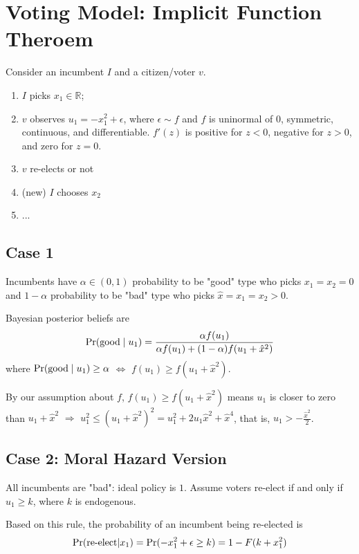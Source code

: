 \documentclass[11pt]{elegantbook}
\begin{document}
\section{Voting Model: Implicit Function Theroem}
Consider an incumbent $I$ and a citizen/voter $v$.
\begin{enumerate}[$\bullet$]
    \item $I$ picks $x_1\in \mathbb{R}$;
    \item $v$ observes $u_1=-x_1^2+\epsilon$, where $\epsilon\sim f$ and $f$ is uninormal of $0$, symmetric, continuous, and differentiable. $f'(z)$ is positive for $z<0$, negative for $z>0$, and zero for $z=0$.
    \item $v$ re-elects or not
    \item (new) $I$ chooses $x_2$
    \item ...
\end{enumerate}

\subsection{Case 1}
Incumbents have $\alpha\in (0,1)$ probability to be "good" type who picks $x_1=x_2=0$ and $1-\alpha$ probability to be "bad" type who picks $\hat{x}=x_1=x_2>0$.

Bayesian posterior beliefs are
\begin{equation}
    \begin{aligned}
        \textnormal{Pr}(\textnormal{good}\mid u_1)=\frac{\alpha f(u_1)}{\alpha f(u_1)+(1-\alpha)f(u_1+\hat{x}^2)}
    \end{aligned}
    \nonumber
\end{equation}
where $\textnormal{Pr}(\textnormal{good}\mid u_1)\geq \alpha$ $\Leftrightarrow$ $f(u_1)\geq f(u_1+\hat{x}^2)$.

By our assumption about $f$, $f(u_1)\geq f(u_1+\hat{x}^2)$ means $u_1$ is closer to zero than $u_1+\hat{x}^2$ $\Rightarrow$ $u_1^2\leq (u_1+\hat{x}^2)^2=u_1^2+2u_1\hat{x}^2+\hat{x}^4$, that is, $u_1>-\frac{\hat{x}^2}{2}$.



\subsection{Case 2: Moral Hazard Version}
All incumbents are "bad": ideal policy is $1$. Assume voters re-elect if and only if $u_1\geq k$, where $k$ is endogenous.

Based on this rule, the probability of an incumbent being re-elected is
\begin{equation}
    \begin{aligned}
        \textnormal{Pr}(\textnormal{re-elect}|x_1)=\textnormal{Pr}(-x_1^2+\epsilon\geq k)=1-F(k+x_1^2)
    \end{aligned}
    \nonumber
\end{equation}
\end{document}
